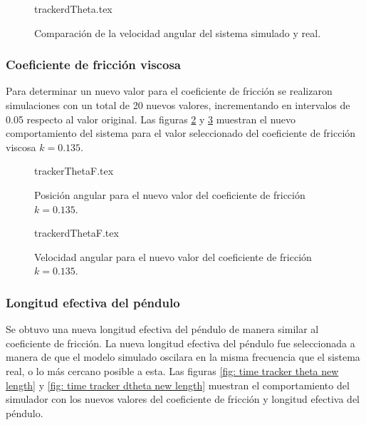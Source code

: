 \begin{figure}[htb!]
\centering
{trackerdTheta.tex}
\caption{Comparación de la velocidad angular del sistema simulado y real.}
\label{fig: time tracker dtheta}
\end{figure}

\subsubsection{Coeficiente de fricción viscosa}
Para determinar un nuevo valor para el coeficiente de fricción se realizaron 
simulaciones con un total de 20 nuevos valores, incrementando en intervalos de
0.05 respecto al valor original.
Las figuras \ref{fig: time tracker theta friction} y 
\ref{fig: time tracker dtheta friction} muestran el nuevo
comportamiento del sistema para el valor seleccionado del coeficiente
de fricción viscosa $k = 0.135$.


\begin{figure}[htb!]
 \centering
{trackerThetaF.tex}
 \caption{Posición angular para el nuevo valor del coeficiente de fricción $k = 0.135$.}
 \label{fig: time tracker theta friction}
\end{figure}

\begin{figure}[htb!]
 \centering
{trackerdThetaF.tex}
 \caption{Velocidad angular para el nuevo valor del coeficiente de fricción $k = 0.135$.}
 \label{fig: time tracker dtheta friction}
\end{figure}

\subsubsection{Longitud efectiva del péndulo}
Se obtuvo una nueva longitud efectiva del péndulo de manera similar al 
coeficiente de fricción. 
La nueva longitud efectiva del péndulo fue seleccionada a manera de que el 
modelo simulado oscilara en la misma frecuencia que el sistema real, o lo 
más cercano posible a esta.
Las figuras \ref{fig: time tracker theta new length} y 
\ref{fig: time tracker dtheta new length} muestran el comportamiento del simulador
con los nuevos valores del coeficiente de fricción y longitud efectiva del péndulo.

